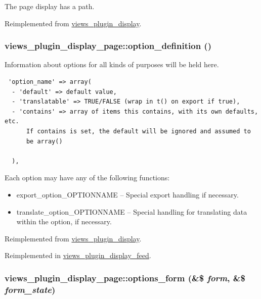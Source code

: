 The page display has a path. 

Reimplemented from \hyperlink{classviews__plugin__display_08fe612e61fe35f549f0ec9a1fe8d953}{views\_\-plugin\_\-display}.\hypertarget{classviews__plugin__display__page_19b25a55cb43755a944d1f37c0180ff4}{
\subsubsection[{option\_\-definition}]{\setlength{\rightskip}{0pt plus 5cm}views\_\-plugin\_\-display\_\-page::option\_\-definition ()}}
\label{classviews__plugin__display__page_19b25a55cb43755a944d1f37c0180ff4}


Information about options for all kinds of purposes will be held here. 

\begin{Code}\begin{verbatim} 'option_name' => array(
  - 'default' => default value,
  - 'translatable' => TRUE/FALSE (wrap in t() on export if true),
  - 'contains' => array of items this contains, with its own defaults, etc.
      If contains is set, the default will be ignored and assumed to
      be array()

  ),
\end{verbatim}
\end{Code}

 Each option may have any of the following functions:\begin{itemize}
\item export\_\-option\_\-OPTIONNAME -- Special export handling if necessary.\item translate\_\-option\_\-OPTIONNAME -- Special handling for translating data within the option, if necessary. \end{itemize}


Reimplemented from \hyperlink{classviews__plugin__display_6eb433a3ccd4225c11b54955d86e2e01}{views\_\-plugin\_\-display}.

Reimplemented in \hyperlink{classviews__plugin__display__feed_9f737ab801100dafa8f1020c0737b598}{views\_\-plugin\_\-display\_\-feed}.\hypertarget{classviews__plugin__display__page_a8267a4774b92a7b47a3768ac98aac36}{
\subsubsection[{options\_\-form}]{\setlength{\rightskip}{0pt plus 5cm}views\_\-plugin\_\-display\_\-page::options\_\-form (\&\$ {\em form}, \/  \&\$ {\em form\_\-state})}}
\label{classviews__plugin__display__page_a8267a4774b92a7b47a3768ac98aac36}


